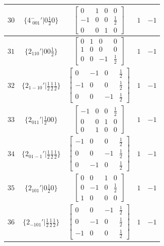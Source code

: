 \documentclass[fleqn,8pt]{jsarticle}
\begin{document}
\begin{longtable}{ccccc}
$ 30 $ & $ \{4^{-}_{\,\,001}{}'|0 \frac{1}{2} 0\} $ & $ \begin{bmatrix} 0 & 1 & 0 & 0 \\ -1 & 0 & 0 & \frac{1}{2} \\ 0 & 0 & 1 & 0 \end{bmatrix} $ & $ 1 $ & $ -1 $ \\ \hline
$ 31 $ & $ \{2{}_{110}{}'|0 0 \frac{1}{2}\} $ & $ \begin{bmatrix} 0 & 1 & 0 & 0 \\ 1 & 0 & 0 & 0 \\ 0 & 0 & -1 & \frac{1}{2} \end{bmatrix} $ & $ 1 $ & $ -1 $ \\ \hline
$ 32 $ & $ \{2{}_{1-10}{}'|\frac{1}{2} \frac{1}{2} \frac{1}{2}\} $ & $ \begin{bmatrix} 0 & -1 & 0 & \frac{1}{2} \\ -1 & 0 & 0 & \frac{1}{2} \\ 0 & 0 & -1 & \frac{1}{2} \end{bmatrix} $ & $ 1 $ & $ -1 $ \\ \hline
$ 33 $ & $ \{2{}_{011}{}'|\frac{1}{2} 0 0\} $ & $ \begin{bmatrix} -1 & 0 & 0 & \frac{1}{2} \\ 0 & 0 & 1 & 0 \\ 0 & 1 & 0 & 0 \end{bmatrix} $ & $ 1 $ & $ -1 $ \\ \hline
$ 34 $ & $ \{2{}_{01-1}{}'|\frac{1}{2} \frac{1}{2} \frac{1}{2}\} $ & $ \begin{bmatrix} -1 & 0 & 0 & \frac{1}{2} \\ 0 & 0 & -1 & \frac{1}{2} \\ 0 & -1 & 0 & \frac{1}{2} \end{bmatrix} $ & $ 1 $ & $ -1 $ \\ \hline
$ 35 $ & $ \{2{}_{101}{}'|0 \frac{1}{2} 0\} $ & $ \begin{bmatrix} 0 & 0 & 1 & 0 \\ 0 & -1 & 0 & \frac{1}{2} \\ 1 & 0 & 0 & 0 \end{bmatrix} $ & $ 1 $ & $ -1 $ \\ \hline
$ 36 $ & $ \{2{}_{-101}{}'|\frac{1}{2} \frac{1}{2} \frac{1}{2}\} $ & $ \begin{bmatrix} 0 & 0 & -1 & \frac{1}{2} \\ 0 & -1 & 0 & \frac{1}{2} \\ -1 & 0 & 0 & \frac{1}{2} \end{bmatrix} $ & $ 1 $ & $ -1 $ \\ \hline

\end{longtable}
\end{document}
